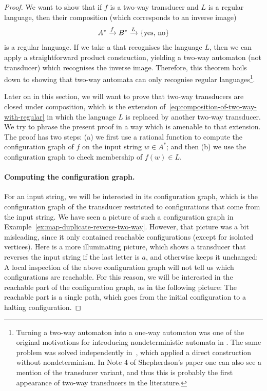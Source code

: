 \begin{proof}
    We want to show that if $f$ is a two-way transducer and $L$ is a regular language, then their composition (which corresponds to an inverse image)
    \begin{align}
        \label{eq:composition-of-two-way-with-regular}
        A^* \xrightarrow f B^* \xrightarrow L \{\text{yes, no}\}
    \end{align}
    is a regular language. If we take a \dfa that recognises the language $L$, then we can apply a straightforward product construction, yielding a two-way automaton (not transducer) which recognises the inverse image. Therefore, this theorem boils down to showing that two-way automata can only recognise regular languages\footnote{Turning a two-way automaton into a one-way automaton was one of the original motivations for introducing nondeterministic automata in \cite{RabinScott59}. The same problem was solved independently in~\cite{shepherdson1959reduction}, which applied a direct construction without nondeterminism. In Note 4 of Shepherdson's paper one can also see a mention of the transducer variant, and thus this is probably the first appearance of two-way transducers in the literature. }.
    
    Later on in this section, we will want to prove that two-way transducers are closed under composition, which is the extension of~\eqref{eq:composition-of-two-way-with-regular} in which the language $L$ is replaced by another two-way transducer. We try to phrase the present proof in a way which is amenable to that extension. The proof has two steps: (a) we first use a rational function to compute the configuration graph of $f$ on the input string $w \in A^*$; and then (b) we use the configuration graph to check membership of $f(w) \in L$.

    \paragraph*{Computing the configuration graph.} For an input string, we will be interested in its configuration graph, which is the configuration graph of the transducer restricted to configurations that come from the input string. We have seen a picture of such a configuration graph in Example~\ref{ex:map-duplicate-reverse-two-way}. However, that picture was a bit misleading, since it only contained reachable configurations (except for isolated vertices). 
    Here is a more illuminating picture, which shows a transducer that reverses the input string if the last letter is $a$, and otherwise keeps it unchanged:
    A local inspection of the above configuration graph will not tell us which configurations are reachable. For this reason, we will be interested in the reachable part of the configuration graph, as in the following picture:
    The reachable part is a single path, which goes from the initial configuration to a halting configuration. 
    

\end{proof}
